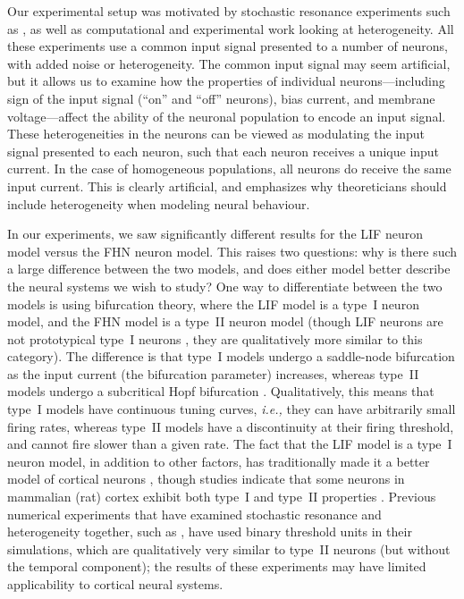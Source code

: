 \documentclass[12pt]{article}
\begin{document}
Our experimental setup was motivated by stochastic resonance experiments such as \cite{Stocks2001}, as well as computational \citep{Brody2003} and experimental \citep{Padmanabhan2010} work looking at heterogeneity. All these experiments use a common input signal presented to a number of neurons, with added noise or heterogeneity. The common input signal may seem artificial, but it allows us to examine how the properties of individual neurons---including sign of the input signal (``on'' and ``off'' neurons), bias current, and membrane voltage---affect the ability of the neuronal population to encode an input signal. These heterogeneities in the neurons can be viewed as modulating the input signal presented to each neuron, such that each neuron receives a unique input current. In the case of homogeneous populations, all neurons do receive the same input current. This is clearly artificial, and emphasizes why theoreticians should include heterogeneity when modeling neural behaviour.

In our experiments, we saw significantly different results for the LIF neuron model versus the FHN neuron model. This raises two questions: why is there such a large difference between the two models, and does either model better describe the neural systems we wish to study? One way to differentiate between the two models is using bifurcation theory, where the LIF model is a type~I neuron model, and the FHN model is a type~II neuron model (though LIF neurons are not prototypical type~I neurons \citep{Mato2008}, they are qualitatively more similar to this category). The difference is that type~I models undergo a saddle-node bifurcation as the input current (the bifurcation parameter) increases, whereas type~II models undergo a subcritical Hopf bifurcation \citep{Mato2008}. Qualitatively, this means that type~I models have continuous tuning curves, \emph{i.e.,} they can have arbitrarily small firing rates, whereas type~II models have a discontinuity at their firing threshold, and cannot fire slower than a given rate. The fact that the LIF model is a type~I neuron model, in addition to other factors, has traditionally made it a better model of cortical neurons \citep{Koch1999}, though studies indicate that some neurons in mammalian (rat) cortex exhibit both type~I and type~II properties \citep{Tateno2004,Tsubo2007}. Previous numerical experiments that have examined stochastic resonance and heterogeneity together, such as \cite{Stocks2000,McDonnell2006}, have used binary threshold units in their simulations, which are qualitatively very similar to type~II neurons (but without the temporal component); the results of these experiments may have limited applicability to cortical neural systems.
\end{document}
